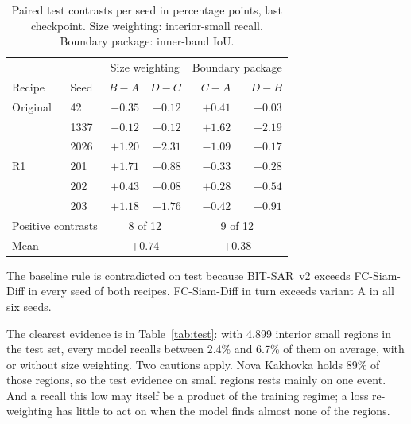\documentclass[runningheads]{llncs}
\begin{document}
\begin{table}[t]
\centering
\caption{Paired test contrasts per seed in percentage points, last checkpoint. Size
weighting: interior-small recall. Boundary package: inner-band IoU.}
\label{tab:contrasts}
\footnotesize\setlength{\tabcolsep}{5pt}
\begin{tabular}{llrrrr}
\toprule
 & & \multicolumn{2}{c}{Size weighting} & \multicolumn{2}{c}{Boundary package} \\
Recipe & Seed & $B-A$ & $D-C$ & $C-A$ & $D-B$ \\
\midrule
Original & 42   & $-0.35$ & $+0.12$ & $+0.41$ & $+0.03$ \\
         & 1337 & $-0.12$ & $-0.12$ & $+1.62$ & $+2.19$ \\
         & 2026 & $+1.20$ & $+2.31$ & $-1.09$ & $+0.17$ \\
R1       & 201  & $+1.71$ & $+0.88$ & $-0.33$ & $+0.28$ \\
         & 202  & $+0.43$ & $-0.08$ & $+0.28$ & $+0.54$ \\
         & 203  & $+1.18$ & $+1.76$ & $-0.42$ & $+0.91$ \\
\midrule
\multicolumn{2}{l}{Positive contrasts} & \multicolumn{2}{c}{8 of 12} & \multicolumn{2}{c}{9 of 12} \\
\multicolumn{2}{l}{Mean} & \multicolumn{2}{c}{$+0.74$} & \multicolumn{2}{c}{$+0.38$} \\
\bottomrule
\end{tabular}
\end{table}

The baseline rule is contradicted on test because BIT-SAR~v2 exceeds FC-Siam-Diff in every
seed of both recipes. FC-Siam-Diff in turn exceeds variant A in all six seeds.

The clearest evidence is in Table~\ref{tab:test}: with 4,899 interior small regions in the
test set, every model recalls between 2.4\% and 6.7\% of them on average, with or without
size weighting. Two cautions apply. Nova Kakhovka holds 89\% of those regions, so the test
evidence on small regions rests mainly on one event. And a recall this low may itself be a
product of the training regime; a loss re-weighting has little to act on when the model
finds almost none of the regions.
\end{document}

